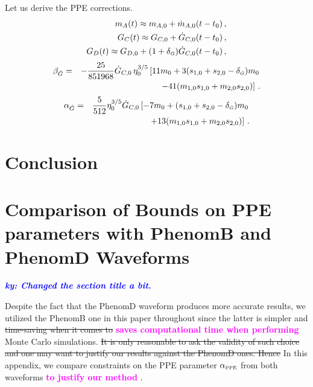 \documentclass[prd,twocolumn,nofootinbib]{revtex4-1}
\newcommand{\PPE}{{\mbox{\tiny PPE}}}
\newcommand{\Gdot}{{\mbox{\tiny $\dot G$}}}
\newcommand{\ky}[1]{\textcolor{blue}{\it{\textbf{ky: #1}}} }
\newcommand{\kent}[1]{\textcolor{magenta}{\textbf{#1}} }
\begin{document}
Let us derive the PPE corrections.
 \begin{eqnarray}\label{eq:3.7a2}
 m_A(t)\approx m_{A,0}+\dot{m}_{A,0}(t-t_0)\,, \\
   \label{eq:3.7a4}  G_C(t)\approx  G_{C,0}+\dot{G}_{C,0}(t-t_0)\,, \\
   \label{eq:3.7a4-2}  G_D(t)\approx  G_{D,0}+(1+\delta_\Gdot)\dot{G}_{C,0}(t-t_0)\, , 
 \end{eqnarray}
 \begin{eqnarray}\label{eq:beta_gdot}
 \beta_{\dot{G}}&=&-\frac{25}{851968}\dot{G}_{C,0}\,\eta_0^{3/5}\left[11m_0 +3(s_{1,0}+s_{2,0}-\delta_\Gdot)m_0 \right. \nonumber \\
 && \left. -41 (m_{1,0}s_{1,0}+m_{2,0}s_{2,0})\right]\,. 
  \end{eqnarray}
\begin{eqnarray}
\label{eq:3.7d2}
 \alpha_{\dot{G}}&=&\frac{5}{512}\eta_0^{3/5}\dot{G}_{C,0}\left[-7m_0+(s_{1,0}+s_{2,0}-\delta_\Gdot)m_0 \right. \nonumber \\
 && \left.+13 (m_{1,0}s_{1,0}+m_{2,0}s_{2,0})\right]\,.
 \end{eqnarray}
\section{Conclusion}
\acknowledgments
 \appendix 
\section{Comparison of Bounds on PPE parameters with PhenomB and PhenomD Waveforms}\label{Appendix}
\ky{Changed the section title a bit.}

Despite the fact that the PhenomD waveform produces more accurate results, we utilized the PhenomB one in this paper throughout since the latter is simpler and \sout{time-saving when it comes to } \kent{saves computational time when performing} Monte Carlo simulations. \sout{It is only reasonable to ask the validity of such choice and one may want to justify our results against the PhenomD ones. Hence} In this appendix, we compare constraints on the PPE parameter $\alpha_\PPE$ from both waveforms \kent{to justify our method}. 
 
\end{document}
